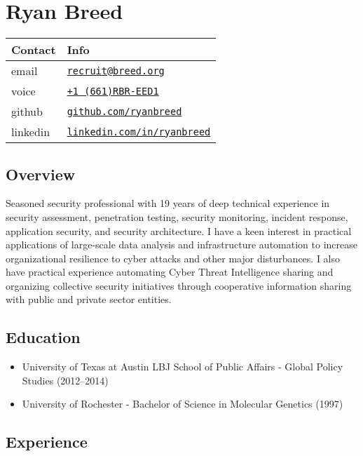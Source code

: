 \documentclass[10pt,]{article}
\date{}
\providecommand{\tightlist}{%
  \setlength{\itemsep}{0pt}\setlength{\parskip}{0pt}}
\begin{document}
\section{Ryan Breed}\label{ryan-breed}

\begin{longtable}[]{@{}ll@{}}
\toprule
Contact & Info\tabularnewline
\midrule
\endhead
email &
\href{mailto:recruit@REMOVETHIS.breed.org}{\texttt{recruit@breed.org}}\tabularnewline
voice &
\href{tel:+16617273331}{\texttt{+1\ (661)RBR-EED1}}\tabularnewline
github &
\href{https://github.com/ryanbreed}{\texttt{github.com/ryanbreed}}\tabularnewline
linkedin &
\href{https://www.linkedin.com/in/ryanbreed}{\texttt{linkedin.com/in/ryanbreed}}\tabularnewline
\bottomrule
\end{longtable}

\subsection{Overview}\label{overview}

Seasoned security professional with 19 years of deep technical
experience in security assessment, penetration testing, security
monitoring, incident response, application security, and security
architecture. I have a keen interest in practical applications of
large-scale data analysis and infrastructure automation to increase
organizational resilience to cyber attacks and other major disturbances.
I also have practical experience automating Cyber Threat Intelligence
sharing and organizing collective security initiatives through
cooperative information sharing with public and private sector entities.

\subsection{Education}\label{education}

\begin{itemize}
\tightlist
\item
  University of Texas at Austin LBJ School of Public Affairs - Global
  Policy Studies (2012--2014)
\item
  University of Rochester - Bachelor of Science in Molecular Genetics
  (1997)
\end{itemize}

\subsection{Experience}\label{experience}
\end{document}
